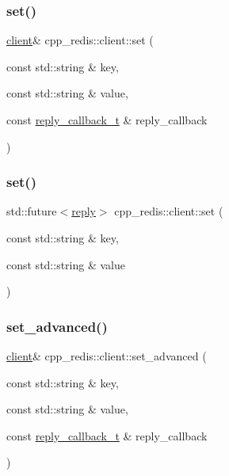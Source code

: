 \subsubsection{\texorpdfstring{set()}{set()}\hspace{0.1cm}{\footnotesize\ttfamily [1/2]}}
{\footnotesize\ttfamily \hyperlink{classcpp__redis_1_1client}{client}\& cpp\+\_\+redis\+::client\+::set (\begin{DoxyParamCaption}\item[{const std\+::string \&}]{key,  }\item[{const std\+::string \&}]{value,  }\item[{const \hyperlink{classcpp__redis_1_1client_a061a1140d36d2eaeda82b09a0bb3f9f2}{reply\+\_\+callback\+\_\+t} \&}]{reply\+\_\+callback }\end{DoxyParamCaption})}

\mbox{\label{classcpp__redis_1_1client_a734ba95a7e2083fe6bc2e209f94ccab6}} 
\subsubsection{\texorpdfstring{set()}{set()}\hspace{0.1cm}{\footnotesize\ttfamily [2/2]}}
{\footnotesize\ttfamily std\+::future$<$\hyperlink{classcpp__redis_1_1reply}{reply}$>$ cpp\+\_\+redis\+::client\+::set (\begin{DoxyParamCaption}\item[{const std\+::string \&}]{key,  }\item[{const std\+::string \&}]{value }\end{DoxyParamCaption})}

\mbox{\label{classcpp__redis_1_1client_aac03b242d1a0948a9eb3567624e72622}} 
\subsubsection{\texorpdfstring{set\+\_\+advanced()}{set\_advanced()}\hspace{0.1cm}{\footnotesize\ttfamily [1/3]}}
{\footnotesize\ttfamily \hyperlink{classcpp__redis_1_1client}{client}\& cpp\+\_\+redis\+::client\+::set\+\_\+advanced (\begin{DoxyParamCaption}\item[{const std\+::string \&}]{key,  }\item[{const std\+::string \&}]{value,  }\item[{const \hyperlink{classcpp__redis_1_1client_a061a1140d36d2eaeda82b09a0bb3f9f2}{reply\+\_\+callback\+\_\+t} \&}]{reply\+\_\+callback }\end{DoxyParamCaption})}

